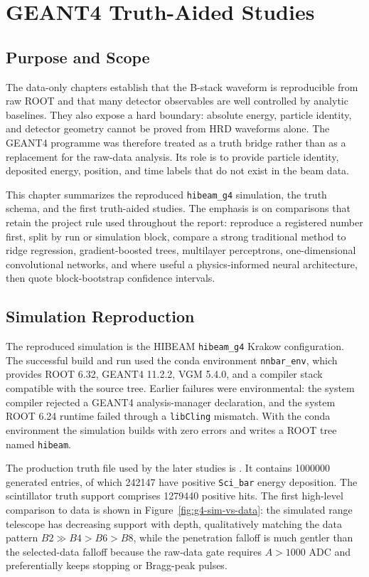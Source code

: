 \chapter{GEANT4 Truth-Aided Studies}

\section{Purpose and Scope}

The data-only chapters establish that the B-stack waveform is reproducible from raw
ROOT and that many detector observables are well controlled by analytic baselines.
They also expose a hard boundary: absolute energy, particle identity, and detector
geometry cannot be proved from HRD waveforms alone. The GEANT4 programme was
therefore treated as a truth bridge rather than as a replacement for the raw-data
analysis. Its role is to provide particle identity, deposited energy, position, and
time labels that do not exist in the beam data.

This chapter summarizes the reproduced \texttt{hibeam\_g4} simulation, the truth
schema, and the first truth-aided studies. The emphasis is on comparisons that
retain the project rule used throughout the report: reproduce a registered number
first, split by run or simulation block, compare a strong traditional method to
ridge regression, gradient-boosted trees, multilayer perceptrons, one-dimensional
convolutional networks, and where useful a physics-informed neural architecture,
then quote block-bootstrap confidence intervals.

\section{Simulation Reproduction}

The reproduced simulation is the HIBEAM \texttt{hibeam\_g4} Krakow configuration.
The successful build and run used the conda environment \texttt{nnbar\_env}, which
provides ROOT 6.32, GEANT4 11.2.2, VGM 5.4.0, and a compiler stack compatible
with the source tree. Earlier failures were environmental: the system compiler
rejected a GEANT4 analysis-manager declaration, and the system ROOT 6.24 runtime
failed through a \texttt{libCling} mismatch. With the conda environment the
simulation builds with zero errors and writes a ROOT tree named \texttt{hibeam}.

The production truth file used by the later studies is
. It contains
\num{1000000} generated entries, of which \num{242147} have positive
\texttt{Sci\_bar} energy deposition. The scintillator truth support comprises
\num{1279440} positive hits. The first high-level comparison to data is shown in
Figure~\ref{fig:g4-sim-vs-data}: the simulated range telescope has decreasing
support with depth, qualitatively matching the data pattern \(B2\gg B4>B6>B8\),
while the penetration falloff is much gentler than the selected-data falloff
because the raw-data gate requires \(A>1000\) ADC and preferentially keeps
stopping or Bragg-peak pulses.

